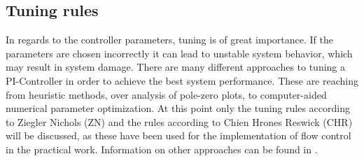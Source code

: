 \subsection{Tuning rules}
In regards to the controller parameters, tuning is of great importance. If the parameters are chosen incorrectly it can lead to unstable system behavior, which may result in system damage. There are many different approaches to tuning a PI-Controller in order to achieve the best system performance. These are reaching from heuristic methods, over analysis of pole-zero plots, to computer-aided numerical parameter optimization.\cite{Reg_10} At this point only the tuning rules according to Ziegler Nichols (ZN) and the rules according to Chien Hrones Reswick (CHR) will be discussed, as these have been used for the implementation of flow control in the practical work.  Information on other approaches can be found in \cite{Reg_11}.

